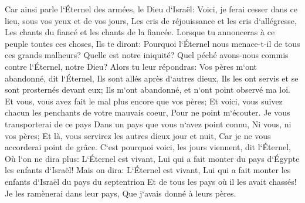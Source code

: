 \verse Car ainsi parle l`Éternel des armées, le Dieu d`Israël: Voici, je ferai cesser dans ce lieu, sous vos yeux et de vos jours, Les cris de réjouissance et les cris d`allégresse, Les chants du fiancé et les chants de la fiancée. 
\verse Lorsque tu annonceras à ce peuple toutes ces choses, Ils te diront: Pourquoi l`Éternel nous menace-t-il de tous ces grands malheurs? Quelle est notre iniquité? Quel péché avons-nous commis contre l`Éternel, notre Dieu? 
\verse Alors tu leur répondras: Vos pères m`ont abandonné, dit l`Éternel, Ils sont allés après d`autres dieux, Ils les ont servis et se sont prosternés devant eux; Ils m`ont abandonné, et n`ont point observé ma loi. 
\verse Et vous, vous avez fait le mal plus encore que vos pères; Et voici, vous suivez chacun les penchants de votre mauvais coeur, Pour ne point m`écouter. 
\verse Je vous transporterai de ce pays Dans un pays que vous n`avez point connu, Ni vous, ni vos pères; Et là, vous servirez les autres dieux jour et nuit, Car je ne vous accorderai point de grâce. 
\verse C`est pourquoi voici, les jours viennent, dit l`Éternel, Où l`on ne dira plus: L`Éternel est vivant, Lui qui a fait monter du pays d`Égypte les enfants d`Israël! 
\verse Mais on dira: L`Éternel est vivant, Lui qui a fait monter les enfants d`Israël du pays du septentrion Et de tous les pays où il les avait chassés! Je les ramènerai dans leur pays, Que j`avais donné à leurs pères. 
